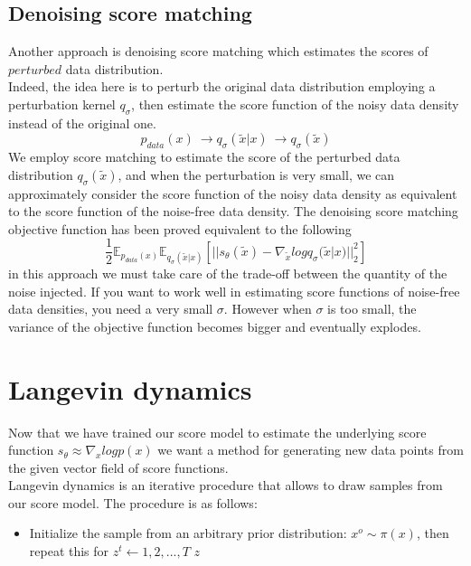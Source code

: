 \documentclass{article}
\begin{document}
	\subsection{Denoising score matching}
	Another approach is denoising score matching which estimates the scores of $perturbed$ data distribution.\\
	Indeed, the idea here is to perturb the original data distribution employing a perturbation kernel $q_{\sigma}$, then estimate the score function of the noisy data density instead of the original one.
	\begin{equation}
	p_{data}(x)\ \longrightarrow q_{\sigma}(\tilde{x}|x)\ \longrightarrow q_{\sigma}(\tilde{x})
	\end{equation}
	We employ score matching to estimate the score of the perturbed data distribution $q_{\sigma}(\tilde{x})$, and when the perturbation is very small, we can approximately consider the score function of the noisy data density as equivalent to the score function of the noise-free data density. The denoising score matching objective function has been proved equivalent to the following
	\begin{equation}
	\frac{1}{2} \mathbb{E}_{p_{data}(x)} \mathbb{E}_{q_{\sigma}(\tilde{x}|x)}[||s_{\theta}(\tilde{x}) - \nabla_{\tilde{x}}logq_{\sigma}(\tilde{x}|x)||_{2}^{2}]
	\end{equation}
	in this approach we must take care of the trade-off between the quantity of the noise injected. If you want to work well in estimating score functions of noise-free data densities, you need a very small $\sigma$. However when $\sigma$ is too small, the variance of the objective function becomes bigger and eventually explodes. 
   \section{Langevin dynamics}
   Now that we have trained our score model to estimate the underlying score function $s_{\theta} \approx \nabla_{x} log p(x)$ we want a method for generating new data points from the given vector field of score functions.\\
   Langevin dynamics is an iterative procedure that allows to draw samples from our score model. The procedure is as follows:
   \begin{itemize}
   	\item Initialize the sample from an arbitrary prior distribution: $x^{o} \sim \pi(x)$, then repeat this for $z^{t} \leftarrow 1,2,...,T$ $z$
   \end{itemize}
\end{document}
